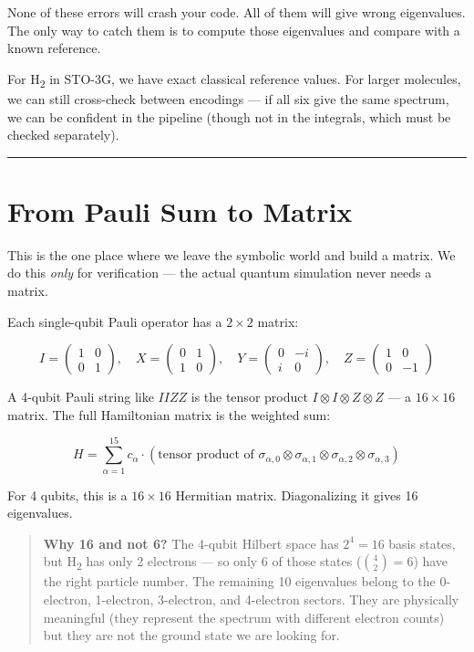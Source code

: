 \documentclass[
  11pt,
  oneside]{book}
\begin{document}
None of these errors will crash your code. All of them will give wrong
eigenvalues. The only way to catch them is to compute those eigenvalues
and compare with a known reference.

For H\textsubscript{2} in STO-3G, we have exact classical reference values. For larger
molecules, we can still cross-check between encodings --- if all six
give the same spectrum, we can be confident in the pipeline (though not
in the integrals, which must be checked separately).

\begin{center}\rule{0.5\linewidth}{0.5pt}\end{center}

\section{From Pauli Sum to Matrix}\label{from-pauli-sum-to-matrix}

This is the one place where we leave the symbolic world and build a
matrix. We do this \emph{only} for verification --- the actual quantum
simulation never needs a matrix.

Each single-qubit Pauli operator has a \(2 \times 2\) matrix:

\[I = \begin{pmatrix}1&0\\0&1\end{pmatrix}, \quad X = \begin{pmatrix}0&1\\1&0\end{pmatrix}, \quad Y = \begin{pmatrix}0&-i\\i&0\end{pmatrix}, \quad Z = \begin{pmatrix}1&0\\0&-1\end{pmatrix}\]

A 4-qubit Pauli string like \(IIZZ\) is the tensor product
\(I \otimes I \otimes Z \otimes Z\) --- a \(16 \times 16\) matrix. The
full Hamiltonian matrix is the weighted sum:

\[H = \sum_{\alpha=1}^{15} c_\alpha \cdot (\text{tensor product of } \sigma_{\alpha,0} \otimes \sigma_{\alpha,1} \otimes \sigma_{\alpha,2} \otimes \sigma_{\alpha,3})\]

For 4 qubits, this is a \(16 \times 16\) Hermitian matrix. Diagonalizing
it gives 16 eigenvalues.

\begin{quote}
\textbf{Why 16 and not 6?} The 4-qubit Hilbert space has \(2^4 = 16\)
basis states, but H\textsubscript{2} has only 2 electrons --- so only 6 of those states
(\(\binom{4}{2} = 6\)) have the right particle number. The remaining 10
eigenvalues belong to the 0-electron, 1-electron, 3-electron, and
4-electron sectors. They are physically meaningful (they represent the
spectrum with different electron counts) but they are not the ground
state we are looking for.
\end{quote}
\end{document}
